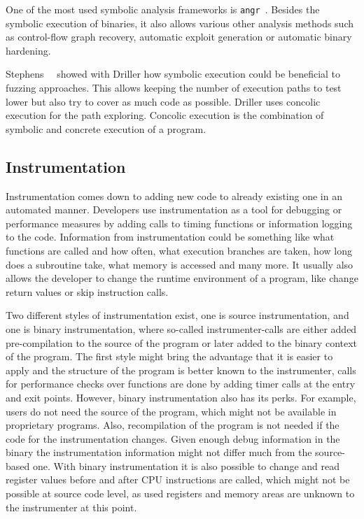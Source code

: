 One of the most used symbolic analysis frameworks is
\texttt{angr}~\cite{angrpaper}. Besides the symbolic execution of binaries, it
also allows various other analysis methods such as control-flow graph recovery,
automatic exploit generation or automatic binary hardening.

Stephens~\etal~\cite{driller} showed with Driller how symbolic execution could
be beneficial to fuzzing approaches. This allows keeping the number of execution
paths to test lower but also try to cover as much code as possible. Driller uses
concolic execution for the path exploring. Concolic execution is the combination
of symbolic and concrete execution of a program.

\subsection{Instrumentation}

Instrumentation comes down to adding new code to already existing one in an
automated manner. Developers use instrumentation as a tool for debugging or
performance measures by adding calls to timing functions or information logging
to the code. Information from instrumentation could be something like what
functions are called and how often, what execution branches are taken, how long
does a subroutine take, what memory is accessed and many more. It usually also
allows the developer to change the runtime environment of a program, like change
return values or skip instruction calls.

Two different styles of instrumentation exist, one is source instrumentation,
and one is binary instrumentation, where so-called instrumenter-calls are either
added pre-compilation to the source of the program or later added to the binary
context of the program. The first style might bring the advantage that it is
easier to apply and the structure of the program is better known to the
instrumenter, calls for performance checks over functions are done by adding
timer calls at the entry and exit points. However, binary instrumentation also
has its perks. For example, users do not need the source of the program, which
might not be available in proprietary programs. Also, recompilation of the
program is not needed if the code for the instrumentation changes. Given enough
debug information in the binary the instrumentation information might not differ
much from the source-based one. With binary instrumentation it is also possible
to change and read register values before and after CPU instructions are called,
which might not be possible at source code level, as used registers and memory
areas are unknown to the instrumenter at this point.

